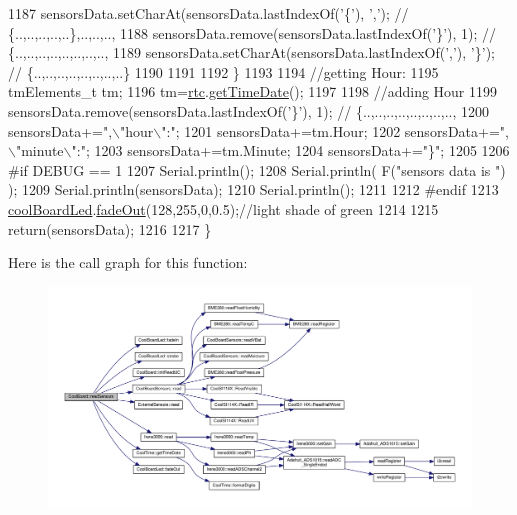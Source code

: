 \begin{DoxyCode}
1187         sensorsData.setCharAt(sensorsData.lastIndexOf(\textcolor{charliteral}{'\{'}), \textcolor{charliteral}{','}); \textcolor{comment}{// \{..,..,..,..,..\},..,..,..,}
1188         sensorsData.remove(sensorsData.lastIndexOf(\textcolor{charliteral}{'\}'}), 1); \textcolor{comment}{// \{..,..,..,..,..,..,..,..,}
1189         sensorsData.setCharAt(sensorsData.lastIndexOf(\textcolor{charliteral}{','}), \textcolor{charliteral}{'\}'}); \textcolor{comment}{// \{..,..,..,..,..,..,..,..\}      }
1190         
1191         
1192     \}
1193 
1194     \textcolor{comment}{//getting Hour:}
1195     tmElements\_t tm;
1196     tm=\hyperlink{class_cool_board_a50d2a6716879d64a85f3c6b44ad63275}{rtc}.\hyperlink{class_cool_time_a7a7501c5ca77dd1248bea704c44f986c}{getTimeDate}();
1197     
1198     \textcolor{comment}{//adding Hour}
1199     sensorsData.remove(sensorsData.lastIndexOf(\textcolor{charliteral}{'\}'}), 1); \textcolor{comment}{// \{..,..,..,..,..,..,..,..,   }
1200     sensorsData+=\textcolor{stringliteral}{",\(\backslash\)"hour\(\backslash\)":"};  
1201     sensorsData+=tm.Hour;
1202     sensorsData+=\textcolor{stringliteral}{",\(\backslash\)"minute\(\backslash\)":"};
1203     sensorsData+=tm.Minute;
1204     sensorsData+=\textcolor{stringliteral}{"\}"};
1205     
1206 \textcolor{preprocessor}{#if DEBUG == 1}
1207     Serial.println();
1208     Serial.println( F(\textcolor{stringliteral}{"sensors data is "}) );
1209     Serial.println(sensorsData);
1210     Serial.println();
1211 
1212 \textcolor{preprocessor}{#endif}
1213     \hyperlink{class_cool_board_a1b1d3c684a5baa56b08486e192fd8e97}{coolBoardLed}.\hyperlink{class_cool_board_led_a93d545679237e8cc858324367149775c}{fadeOut}(128,255,0,0.5);\textcolor{comment}{//light shade of green}
1214 
1215     \textcolor{keywordflow}{return}(sensorsData);
1216 
1217 \}
\end{DoxyCode}
Here is the call graph for this function\+:
\nopagebreak
\begin{figure}[H]
\begin{center}
\leavevmode
\includegraphics[width=350pt]{d7/df9/class_cool_board_ad03abdce2e65f520bbf2cff0f2d083cf_cgraph}
\end{center}
\end{figure}
